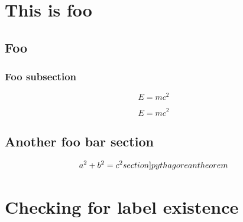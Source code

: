 \documentclass{book}
\begin{document}
\chapter{This is foo}\label{foochapterlabel}

\setcounter{section}{5}
\section{Foo}\label{foosectionlabel} 

\subsection{Foo subsection} \label{foosubsectionlabel}

\begin{equation}
  E=mc^{2}\label{firstequationlabel}
\end{equation}

\begin{equation}
  E=mc^{2}\label{fooequationlabel}
\end{equation}


\clearpage

\section{Another foo bar section}
\begin{equation}
  a^{2} + b^{2}=c^{2}\label[section]{pythagoreantheorem}%
\end{equation}


\chapter{Checking for label existence}


\end{document}
